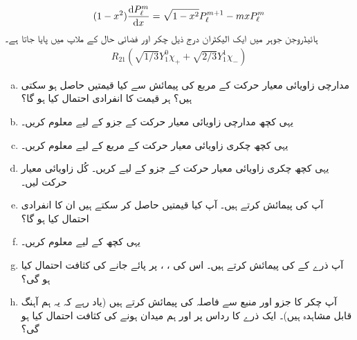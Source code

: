 \begin{align}
 (1-x^{2})\frac{ \dif P_{\ell}^{m}} {\dif x}=\sqrt{1-x^{2}} P_{\ell}^{m+1}-mxP_{\ell}^{m}
\end{align}
ہائیڈروجن جوہر میں ایک الیکٹران درج ذیل چکر اور فضائی حال کے ملاپ میں پایا جاتا ہے۔
\begin{align*}
 R_{21}(\sqrt{1/3}Y_{1}^{0}\chi_+ + \sqrt{2/3}Y_{1}^{1}\chi_-)
\end{align*} 
\begin{enumerate}[a.]
\item
 مدارچی زاویائی معیار حرکت کے مربع  کی پیمائش سے کیا قیمتیں حاصل ہو سکتی ہیں؟ ہر قیمت کا انفرادی احتمال کیا ہو گا؟ 
\item 
یہی کچھ مدارچی زاویائی معیار حرکت کے  جزو  کے لیے معلوم کریں۔
\item 
یہی کچھ چکری زاویائی معیار حرکت کے مربع  کے لیے معلوم کریں۔
\item
 یہی کچھ چکری زاویائی معیار حرکت کے  جزو  کے لیے کریں۔ کُل زاویائی معیار حرکت  لیں۔
\item
 آپ  کی پیمائش کرتے ہیں۔ آپ کیا قیمتیں حاصل کر سکتے ہیں ان کا انفرادی احتمال کیا ہو گا؟
\item
 یہی کچھ  کے لیے معلوم کریں۔
\item
 آپ ذرے کے  کی پیمائش کرتے ہیں۔ اس کی ، ،  پر پائے جانے کی کثافت احتمال کیا ہو گی؟ 
\item
 آپ چکر کا  جزو اور منبع سے فاصلہ کی پیمائش کرتے ہیں (یاد رہے کہ یہ ہم آہنگ قابل مشاہدہ ہیں)۔ ایک ذرے کا رداس  پر اور ہم میدان ہونے کی کثافت احتمال کیا ہو گی؟ 
\end{enumerate}
